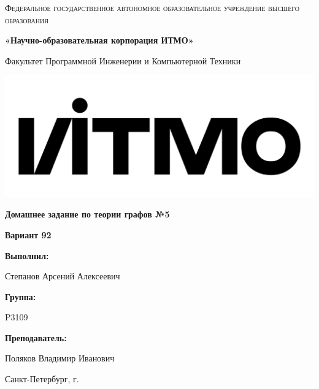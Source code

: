 \documentclass[12pt,a4paper]{report}
\begin{document}
\begin{titlepage} 
	\centering
	{
        \scshape
        Федеральное государственное автономное образовательное учреждение высшего образования
        \par
        \textbf{«Научно-образовательная корпорация ИТМО»}
        \par
        \vspace*{1cm}
        Факультет Программной Инженерии и Компьютерной Техники
        \par
    }
    \vspace*{0.6cm}
    \includegraphics[width=\textwidth]{logo.png}
    {
        \Large
        \textbf{Домашнее задание по теории графов №5}
        \par
        \normalsize
        \vspace*{0.75cm}
        \textbf{Вариант 92}
        \par
    }
    \vfill
    \hfill\begin{minipage}{\dimexpr\textwidth-7.8cm}
        \textbf{Выполнил:}\par
        Степанов Арсений Алексеевич\par
        \vspace*{0.15cm}
        \textbf{Группа:}\par
        P3109\par
        \vspace*{0.15cm}
        \textbf{Преподаватель:}\par
        Поляков Владимир Иванович\par
    \end{minipage}
    \vfill
    Санкт-Петербург, \the\year{}г.
\end{titlepage}  
\onehalfspacing
\end{document}
